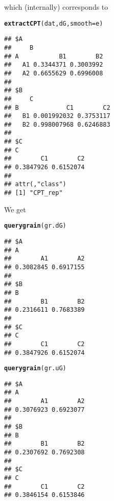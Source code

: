 \documentclass[10pt]{article}\usepackage[]{graphicx}\usepackage[]{color}
\makeatletter
\newcommand{\hlstd}[1]{\textcolor[rgb]{0.345,0.345,0.345}{#1}}%
\newcommand{\hlkwc}[1]{\textcolor[rgb]{0.333,0.667,0.333}{#1}}%
\newcommand{\hlkwd}[1]{\textcolor[rgb]{0.737,0.353,0.396}{\textbf{#1}}}%
\newenvironment{kframe}{%
 \def\at@end@of@kframe{}%
 \ifinner\ifhmode%
  \def\at@end@of@kframe{\end{minipage}}%
  \begin{minipage}{\columnwidth}%
 \fi\fi%
 \def\FrameCommand##1{\hskip\@totalleftmargin \hskip-\fboxsep
 \colorbox{shadecolor}{##1}\hskip-\fboxsep
     \hskip-\linewidth \hskip-\@totalleftmargin \hskip\columnwidth}%
 \MakeFramed {\advance\hsize-\width
   \@totalleftmargin\z@ \linewidth\hsize
   \@setminipage}}%
 {\par\unskip\endMakeFramed%
 \at@end@of@kframe}
\newenvironment{knitrout}{}{} %
\makeatother
\begin{document}
which (internally) corresponds to
\begin{knitrout}
\color{fgcolor}\begin{kframe}
\begin{alltt}
\hlkwd{extractCPT}\hlstd{(dat, dG,} \hlkwc{smooth}\hlstd{=e)}
\end{alltt}
\begin{verbatim}
## $A
##     B
## A           B1        B2
##   A1 0.3344371 0.3003992
##   A2 0.6655629 0.6996008
## 
## $B
##     C
## B             C1        C2
##   B1 0.001992032 0.3753117
##   B2 0.998007968 0.6246883
## 
## $C
## C
##        C1        C2 
## 0.3847926 0.6152074 
## 
## attr(,"class")
## [1] "CPT_rep"
\end{verbatim}
\end{kframe}
\end{knitrout}

We get
\begin{knitrout}
\color{fgcolor}\begin{kframe}
\begin{alltt}
\hlkwd{querygrain}\hlstd{(gr.dG)}
\end{alltt}
\begin{verbatim}
## $A
## A
##        A1        A2 
## 0.3082845 0.6917155 
## 
## $B
## B
##        B1        B2 
## 0.2316611 0.7683389 
## 
## $C
## C
##        C1        C2 
## 0.3847926 0.6152074
\end{verbatim}
\begin{alltt}
\hlkwd{querygrain}\hlstd{(gr.uG)}
\end{alltt}
\begin{verbatim}
## $A
## A
##        A1        A2 
## 0.3076923 0.6923077 
## 
## $B
## B
##        B1        B2 
## 0.2307692 0.7692308 
## 
## $C
## C
##        C1        C2 
## 0.3846154 0.6153846
\end{verbatim}
\end{kframe}
\end{knitrout}
\end{document}
